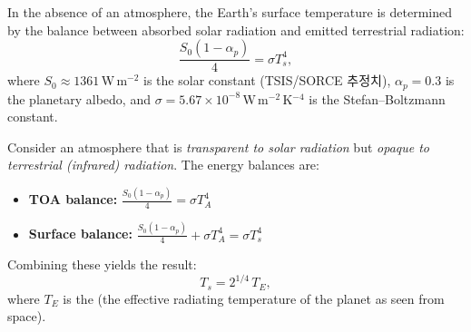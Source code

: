 \begin{definition}\label{def:no-atm-ebm}

  In the absence of an atmosphere, the Earth's surface temperature is determined by
  the balance between absorbed solar radiation and emitted terrestrial radiation:
  \begin{equation}\label{eq:no-atm-balance}
    \frac{S_0 (1 - \alpha_p)}{4} = \sigma T_s^4,
  \end{equation}
  where $S_0 \approx 1361$\,W\,m$^{-2}$ is the solar constant (TSIS/SORCE 추정치), $\alpha_p = 0.3$ is the
  planetary albedo, and $\sigma = 5.67 \times 10^{-8}$\,W\,m$^{-2}$\,K$^{-4}$ is the
  Stefan--Boltzmann constant.
\end{definition}

\begin{hisublock}
\end{hisublock}

\begin{definition}\label{def:single-layer-atm}

  Consider an atmosphere that is \emph{transparent to solar radiation} but
  \emph{opaque to terrestrial (infrared) radiation}.  The energy balances are:
  \begin{itemize}
    \item \textbf{TOA balance:}
      $\displaystyle \frac{S_0(1 - \alpha_p)}{4} = \sigma T_A^4$
    \item \textbf{Surface balance:}
      $\displaystyle \frac{S_0(1 - \alpha_p)}{4} + \sigma T_A^4 = \sigma T_s^4$
  \end{itemize}
  Combining these yields the  result:
  \begin{equation}\label{eq:greenhouse-factor}
    T_s = 2^{1/4}\, T_E,
  \end{equation}
  where $T_E$ is the  (the effective radiating temperature
  of the planet as seen from space).
\end{definition}

\begin{hisublock}
\end{hisublock}


